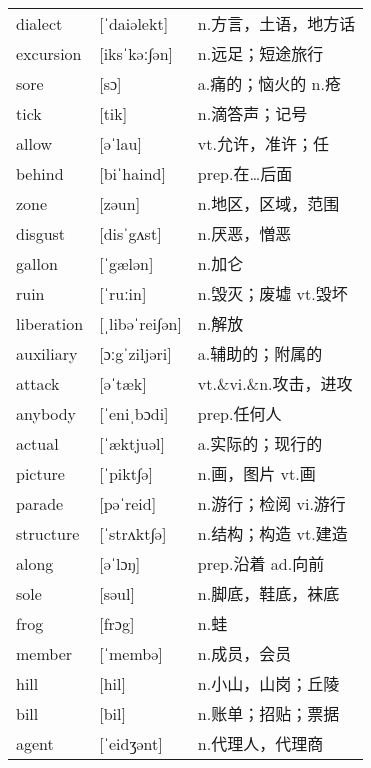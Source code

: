\documentclass[a4paper]{article}
\begin{document}
\section{}
\begin{tabular}{l l l}

dialect & [ˈdaiəlekt] & n.方言，土语，地方话 \\
excursion & [iksˈkəː∫ən] & n.远足；短途旅行 \\
sore & [sɔ] & a.痛的；恼火的 n.疮 \\
tick & [tik] & n.滴答声；记号 \\
allow & [əˈlau] & vt.允许，准许；任 \\
behind & [biˈhaind] & prep.在…后面 \\
zone & [zəun] & n.地区，区域，范围 \\
disgust & [disˈgʌst] & n.厌恶，憎恶 \\
gallon & [ˈgælən] & n.加仑 \\
ruin & [ˈruːin] & n.毁灭；废墟 vt.毁坏 \\
liberation & [ˌlibəˈrei∫ən] & n.解放 \\
auxiliary & [ɔːgˈziljəri] & a.辅助的；附属的 \\
attack & [əˈtæk] & vt.\&vi.\&n.攻击，进攻 \\
anybody & [ˈeniˌbɔdi] & prep.任何人 \\
actual & [ˈæktjuəl] & a.实际的；现行的 \\
picture & [ˈpikt∫ə] & n.画，图片 vt.画 \\
parade & [pəˈreid] & n.游行；检阅 vi.游行 \\
structure & [ˈstrʌkt∫ə] & n.结构；构造 vt.建造 \\
along & [əˈlɔŋ] & prep.沿着 ad.向前 \\
sole & [səul] & n.脚底，鞋底，袜底 \\
frog & [frɔg] & n.蛙 \\
member & [ˈmembə] & n.成员，会员 \\
hill & [hil] & n.小山，山岗；丘陵 \\
bill & [bil] & n.账单；招贴；票据 \\
agent & [ˈeidʒənt] & n.代理人，代理商 \\

\end{tabular}
\end{document}
